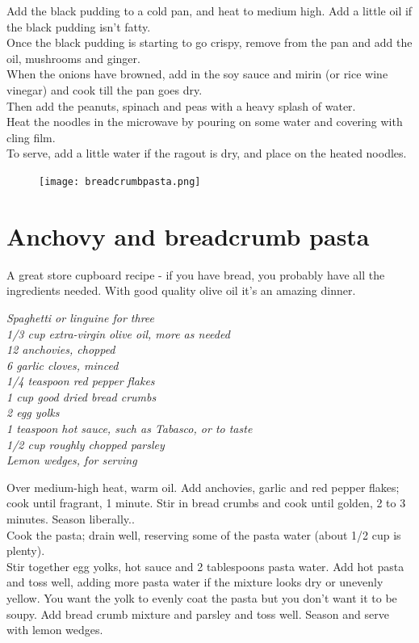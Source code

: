 \documentclass{tufte-book}
\begin{document}
\smallskip
Add the black pudding to a cold pan, and heat to medium high. Add a little oil if the black pudding isn't fatty. 
\\Once the black pudding is starting to go crispy, remove from the pan and add the oil, mushrooms and ginger.
\\When the onions have browned, add in the soy sauce and mirin (or rice wine vinegar) and cook till the pan goes dry.
\\Then add the peanuts, spinach and peas with a heavy splash of water.
\\Heat the noodles in the microwave by pouring on some water and covering with cling film.
\\To serve, add a little water if the ragout is dry, and place on the heated noodles.


\newpage

\begin{figure}[h]
  \texttt{[image: breadcrumbpasta.png]}
\end{figure}

\section{Anchovy and breadcrumb pasta }

A great store cupboard recipe - if you have bread, you probably have all the ingredients needed. With good quality olive oil it's an amazing dinner.

\smallskip
\emph{Spaghetti or linguine for three
\\1/3 cup extra-virgin olive oil, more as needed
\\12 anchovies, chopped
\\6 garlic cloves, minced
\\1/4 teaspoon red pepper flakes
\\1 cup good dried bread crumbs
\\2 egg yolks
\\1 teaspoon hot sauce, such as Tabasco, or to taste
\\1/2 cup roughly chopped parsley
\\Lemon wedges, for serving}

\smallskip
Over medium-high heat, warm oil. Add anchovies, garlic and red pepper flakes; cook until fragrant, 1 minute. Stir in bread crumbs and cook until golden, 2 to 3 minutes. Season liberally..
\\Cook the pasta; drain well, reserving some of the pasta water (about 1/2 cup is plenty). 
\\Stir together egg yolks, hot sauce and 2 tablespoons pasta water. Add hot pasta and toss well, adding more pasta water if the mixture looks dry or unevenly yellow. You want the yolk to evenly coat the pasta but you don't want it to be soupy. Add bread crumb mixture and parsley and toss well. Season and serve with lemon wedges.
\end{document}

